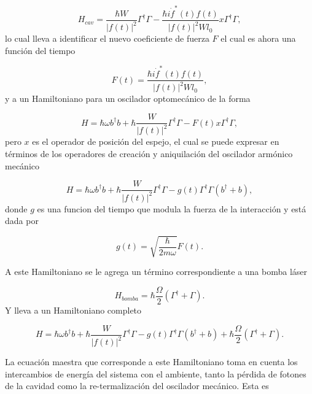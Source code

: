 \documentclass[10pt,a4paper]{report}
\begin{document}
\begin{equation}
H_{cav} = \frac{\hbar W}{|f(t)|^2}\Gamma^\dagger \Gamma - \frac{\hbar i\dot{f}^*(t)f(t) }{|f(t)|^2W l_0}x  \Gamma^ \dagger \Gamma,
\end{equation} lo cual lleva a identificar el nuevo coeficiente de fuerza $F$ el cual es ahora una función del tiempo

\begin{equation}
F(t) = \frac{\hbar i\dot{f}^*(t)f(t) }{|f(t)|^2W l_0},
\end{equation} y a un Hamiltoniano para un oscilador optomecánico de la forma

\begin{equation}
H = \hbar \omega b^\dagger b + \hbar\frac{ W}{|f(t)|^2}\Gamma^\dagger \Gamma -F(t)x\Gamma^\dagger \Gamma,
\end{equation} pero $x$ es el operador de posición del espejo, el cual se puede expresar en términos de los operadores de creación y aniquilación del oscilador armónico mecánico

\begin{equation}
H = \hbar \omega b^\dagger b + \hbar\frac{ W}{|f(t)|^2}\Gamma^\dagger \Gamma -g(t)\Gamma^\dagger \Gamma(b^\dagger + b),
\end{equation} donde $g$ es una funcion del tiempo que modula la fuerza de la interacción y está dada por

\begin{equation}
g(t) = \sqrt{\frac{\hbar}{2m\omega}}F(t).
\end{equation}

A este Hamiltoniano se le agrega un término correspondiente a una bomba láser

\begin{equation}
H_{bomba}= \hbar \frac{\Omega}{2}(\Gamma^\dagger + \Gamma).
\end{equation} Y lleva a un Hamiltoniano completo

\begin{equation}
H = \hbar \omega b^\dagger b + \hbar\frac{ W}{|f(t)|^2}\Gamma^\dagger \Gamma -g(t)\Gamma^\dagger \Gamma(b^\dagger + b) + \hbar \frac{\Omega}{2}(\Gamma^\dagger + \Gamma).
\end{equation}

 La ecuación maestra que corresponde a este Hamiltoniano toma en cuenta los intercambios de energía del sistema con el ambiente, tanto la pérdida de fotones de la cavidad como la re-termalización del oscilador mecánico. Esta es \cite{BarberisLC}
\end{document}
